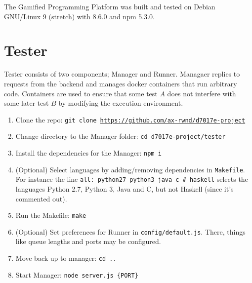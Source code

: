 The Gamified Programming Platform was built and tested on Debian GNU/Linux 9 (stretch) with \nodejs{} 8.6.0 and npm 5.3.0.

\section{Tester}
Tester consists of two components; Manager and Runner. Managaer replies to requests from the backend and manages docker containers that run arbitrary code. Containers are used to ensure that some test $A$ does not interfere with some later test $B$ by modifying the execution environment.\\
\begin{enumerate}
    \item Clone the repo: \texttt{git clone \url{https://github.com/ax-rwnd/d7017e-project}}
    \item Change directory to the Manager folder: \texttt{cd d7017e-project/tester}
    \item Install the dependencies for the Manager: \texttt{npm i}
    \item (Optional) Select languages by adding/removing dependencies in \texttt{Makefile}. For instance the line \texttt{all: python27 python3 java c \# haskell} selects the languages Python 2.7, Python 3, Java and C, but not Haskell (since it's commented out).
    \item Run the Makefile: \texttt{make}
    \item (Optional) Set preferences for Runner in \texttt{config/default.js}. There, things like queue lengths and ports may be configured.
    \item Move back up to manager: \texttt{cd ..}
    \item Start Manager: \texttt{node server.js \{PORT\}}
\end{enumerate}

